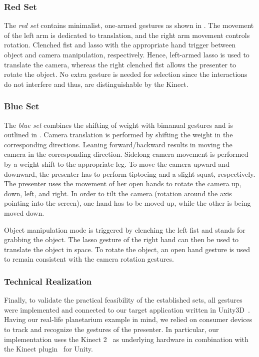 \documentclass{sigchi}
\begin{document}
\subsubsection{Red Set}
The \textit{red set} contains minimalist, one-armed gestures as shown in . The movement of the left arm is dedicated to translation, and the right arm movement controls rotation. Clenched fist and lasso with the appropriate hand trigger between object and camera manipulation, respectively. Hence, left-armed lasso is used to translate the camera, whereas the right clenched fist allows the presenter to rotate the object. No extra gesture is needed for selection since the interactions do not interfere and thus, are distinguishable by the Kinect.





\subsubsection{Blue Set}

The \textit{blue set} combines the shifting of weight with bimanual gestures and is outlined in . Camera translation is performed by shifting the weight in the corresponding directions. Leaning forward/backward results in moving the camera in the corresponding direction. Sidelong camera movement is performed by a weight shift to the appropriate leg.
To move the camera upward and downward, the presenter has to perform tiptoeing and a slight squat, respectively. The presenter uses the movement of her open hands to rotate the camera up, down, left, and right. In order to tilt the camera (rotation around the axis pointing into the screen), one hand has to be moved up, while the other is being moved down.

Object manipulation mode is triggered by clenching the left fist and stands for grabbing the object. The lasso gesture of the right hand can then be used to translate the object in space. To rotate the object, an open hand gesture is used to remain consistent with the camera rotation gestures. 





\subsubsection{Technical Realization}
Finally, to validate the practical feasibility of the established sets, all gestures were implemented and connected to our target application written in Unity3D~\cite{UnityFacts}. Having our real-life planetarium example in mind, we relied on consumer devices to track and recognize the gestures of the presenter. In particular, our implementation uses the Kinect 2~\cite{WindowsKinect} as underlying hardware in combination with the Kinect plugin~\cite{UnityPlugin} for Unity.
\end{document}
